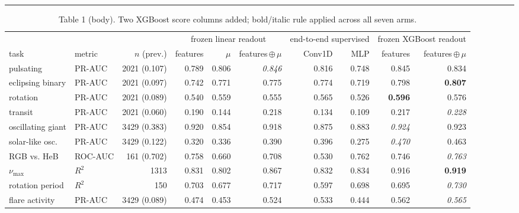 \documentclass{article}
\begin{document}
\noindent\rule{\linewidth}{0.4pt}\par{}
\begin{table}[h]\caption{Table 1 (body). Two XGBoost score columns added; bold/italic rule applied across all seven arms.}
\centering\scriptsize
\begin{tabular}{llrrrrrrrr}
\toprule
 & & & \multicolumn{3}{c}{frozen linear readout} & \multicolumn{2}{c}{end-to-end supervised} & \multicolumn{2}{c}{frozen XGBoost readout} \\
\cmidrule(lr){4-6}\cmidrule(lr){7-8}\cmidrule(lr){9-10}
task & metric & $n$ (prev.) & features & $\mu$ & features\,$\oplus$\,$\mu$ & Conv1D & MLP & features & features\,$\oplus$\,$\mu$ \\
\midrule
pulsating & PR-AUC & 2021 (0.107) & 0.789 & 0.806 & \textit{0.846} & 0.816 & 0.748 & 0.845 & 0.834 \\
eclipsing binary & PR-AUC & 2021 (0.097) & 0.742 & 0.771 & 0.775 & 0.774 & 0.719 & 0.798 & \textbf{0.807} \\
rotation & PR-AUC & 2021 (0.089) & 0.540 & 0.559 & 0.555 & 0.565 & 0.526 & \textbf{0.596} & 0.576 \\
transit & PR-AUC & 2021 (0.060) & 0.190 & 0.144 & 0.218 & 0.134 & 0.109 & 0.217 & \textit{0.228} \\
oscillating giant & PR-AUC & 3429 (0.383) & 0.920 & 0.854 & 0.918 & 0.875 & 0.883 & \textit{0.924} & 0.923 \\
solar-like osc. & PR-AUC & 3429 (0.122) & 0.320 & 0.336 & 0.390 & 0.396 & 0.275 & \textit{0.470} & 0.463 \\
RGB vs. HeB & ROC-AUC & 161 (0.702) & 0.758 & 0.660 & 0.708 & 0.530 & 0.762 & 0.746 & \textit{0.763} \\
$\nu_{\max}$ & $R^2$ & 1313 & 0.831 & 0.802 & 0.867 & 0.832 & 0.834 & 0.916 & \textbf{0.919} \\
rotation period & $R^2$ & 150 & 0.703 & 0.677 & 0.717 & 0.597 & 0.698 & 0.695 & \textit{0.730} \\
flare activity & PR-AUC & 3429 (0.089) & 0.474 & 0.453 & 0.524 & 0.533 & 0.444 & 0.562 & \textit{0.565} \\
\bottomrule
\end{tabular}
\end{table}
\end{document}
